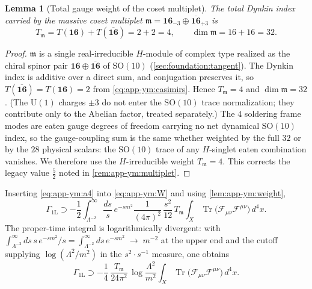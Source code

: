\documentclass[11pt]{article}
\theoremstyle{plain}
\newtheorem{lemma}[theorem]{Lemma}
\theoremstyle{definition}
\theoremstyle{remark}
\newcommand{\SO}[1]{\mathrm{SO}(#1)}
\newcommand{\U}[1]{\mathrm{U}(#1)}
\newcommand{\Tr}{\operatorname{Tr}}
\newcommand{\SOTen}{\SO{10}}
\newcommand{\UOne}{\U{1}}
\begin{document}
\begin{lemma}[Total gauge weight of the coset multiplet]
\label{lem:app-ym:weight}
The total Dynkin index carried by the massive coset multiplet
$\mathfrak m=\mathbf{16}_{-3}\oplus\overline{\mathbf{16}}_{+3}$ is
\begin{equation}\label{eq:app-ym:Ttot}
  T_{\mathfrak m}
  =T(\mathbf{16})+T(\overline{\mathbf{16}})
  =2+2=4 ,
  \qquad
  \dim\mathfrak m=16+16=32 .
\end{equation}
\end{lemma}

\begin{proof}
$\mathfrak m$ is a single real-irreducible $H$-module of complex type
realized as the chiral spinor pair $\mathbf{16}\oplus
\overline{\mathbf{16}}$ of $\SOTen$
(\autoref{sec:foundation:tangent}). The Dynkin index is additive over a
direct sum, and conjugation preserves it, so
$T(\overline{\mathbf{16}})=T(\mathbf{16})=2$ from
\eqref{eq:app-ym:casimirs}. Hence $T_{\mathfrak m}=4$ and
$\dim\mathfrak m=32$. (The $\UOne$ charges $\pm3$ do not enter the
$\SOTen$ trace normalization; they contribute only to the Abelian
factor, treated separately.) The $4$ soldering frame modes are eaten
gauge degrees of freedom carrying no net dynamical $\SOTen$ index, so the
gauge-coupling sum is the same whether weighted by the full $32$ or by
the $28$ physical scalars: the $\SOTen$ trace of any $H$-singlet eaten
combination vanishes. We therefore use the $H$-irreducible weight
$T_{\mathfrak m}=4$. This corrects the legacy value $\tfrac52$ noted in
\autoref{rem:app-ym:multiplet}.
\end{proof}

Inserting \eqref{eq:app-ym:a4} into \eqref{eq:app-ym:W} and using
\autoref{lem:app-ym:weight},
\begin{equation}\label{eq:app-ym:insert}
  \Gamma_{\mathrm{1L}}
  \supset
  -\frac12\int_{\Lambda^{-2}}^{\infty}\frac{ds}{s}\,e^{-sm^{2}}
   \frac{1}{(4\pi)^{2}}\,\frac{s^{2}}{12}\,T_{\mathfrak m}
   \int_{X}\Tr\bigl(\mathcal F_{\mu\nu}\mathcal F^{\mu\nu}\bigr)\,d^{4}x .
\end{equation}
The proper-time integral is logarithmically divergent: with
$\int_{\Lambda^{-2}}^{\infty}ds\,s\,e^{-sm^{2}}/s
=\int_{\Lambda^{-2}}^{\infty}ds\,e^{-sm^{2}}
\;\to\;m^{-2}$ at the upper end and the cutoff supplying
$\log(\Lambda^{2}/m^{2})$ in the $s^{2}\!\cdot s^{-1}$ measure, one
obtains
\begin{equation}\label{eq:app-ym:log}
  \Gamma_{\mathrm{1L}}
  \supset
  -\frac14\,\frac{T_{\mathfrak m}}{24\pi^{2}}\,
   \log\frac{\Lambda^{2}}{m^{2}}
   \int_{X}\Tr\bigl(\mathcal F_{\mu\nu}\mathcal F^{\mu\nu}\bigr)\,d^{4}x .
\end{equation}
\end{document}
